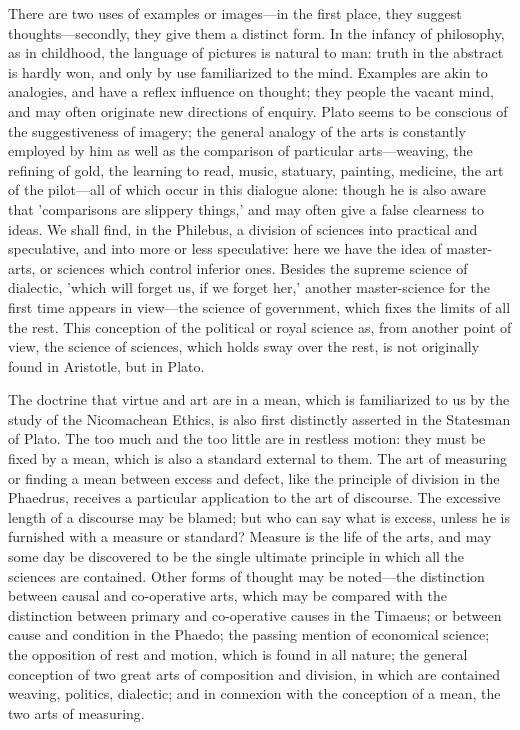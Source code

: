\documentclass[11pt,letter]{article}
\begin{document}
\par  There are two uses of examples or images—in the first place, they suggest thoughts—secondly, they give them a distinct form. In the infancy of philosophy, as in childhood, the language of pictures is natural to man: truth in the abstract is hardly won, and only by use familiarized to the mind. Examples are akin to analogies, and have a reflex influence on thought; they people the vacant mind, and may often originate new directions of enquiry. Plato seems to be conscious of the suggestiveness of imagery; the general analogy of the arts is constantly employed by him as well as the comparison of particular arts—weaving, the refining of gold, the learning to read, music, statuary, painting, medicine, the art of the pilot—all of which occur in this dialogue alone: though he is also aware that 'comparisons are slippery things,' and may often give a false clearness to ideas. We shall find, in the Philebus, a division of sciences into practical and speculative, and into more or less speculative: here we have the idea of master-arts, or sciences which control inferior ones. Besides the supreme science of dialectic, 'which will forget us, if we forget her,' another master-science for the first time appears in view—the science of government, which fixes the limits of all the rest. This conception of the political or royal science as, from another point of view, the science of sciences, which holds sway over the rest, is not originally found in Aristotle, but in Plato.

\par  The doctrine that virtue and art are in a mean, which is familiarized to us by the study of the Nicomachean Ethics, is also first distinctly asserted in the Statesman of Plato. The too much and the too little are in restless motion: they must be fixed by a mean, which is also a standard external to them. The art of measuring or finding a mean between excess and defect, like the principle of division in the Phaedrus, receives a particular application to the art of discourse. The excessive length of a discourse may be blamed; but who can say what is excess, unless he is furnished with a measure or standard? Measure is the life of the arts, and may some day be discovered to be the single ultimate principle in which all the sciences are contained. Other forms of thought may be noted—the distinction between causal and co-operative arts, which may be compared with the distinction between primary and co-operative causes in the Timaeus; or between cause and condition in the Phaedo; the passing mention of economical science; the opposition of rest and motion, which is found in all nature; the general conception of two great arts of composition and division, in which are contained weaving, politics, dialectic; and in connexion with the conception of a mean, the two arts of measuring.
\end{document}
